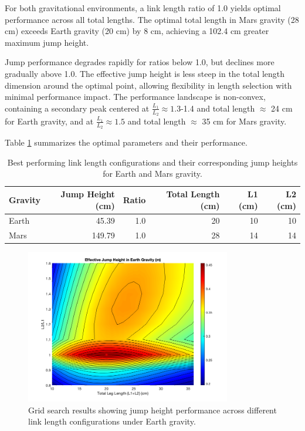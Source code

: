 For both gravitational environments, a link length ratio of 1.0 yields optimal performance across all total lengths. The optimal total length in Mars gravity (28 cm) exceeds Earth gravity (20 cm) by 8 cm, achieving a 102.4 cm greater maximum jump height.

Jump performance degrades rapidly for ratios below 1.0, but declines more gradually above 1.0. The effective jump height is less steep in the total length dimension around the optimal point, allowing flexibility in length selection with minimal performance impact. The performance landscape is non-convex, containing a secondary peak centered at \(\frac{L_1}{L_2} \approx 1.3\)-1.4 and total length $\approx$ 24 cm for Earth gravity, and at \(\frac{L_1}{L_2} \approx 1.5\) and total length $\approx$ 35 cm for Mars gravity.

Table \ref{tab:results:grid_search:best_jumps} summarizes the optimal parameters and their performance.
\begin{table}[h]

    \centering
    \begin{tabular}{lrrrrr}
        \hline
        Gravity & Jump Height (cm) & Ratio & Total Length (cm) & L1 (cm) & L2 (cm) \\
        \hline
        Earth & 45.39 & 1.0 & 20 & 10 & 10 \\
        Mars & 149.79 & 1.0 & 28 & 14 & 14 \\
        \hline
    \end{tabular}
    \caption{Best performing link length configurations and their corresponding jump heights for Earth and Mars gravity.}
    \label{tab:results:grid_search:best_jumps}
\end{table}


\begin{figure}[H]
    \centering
    \includegraphics[width=0.8\textwidth]{Images/results/grid_search_earth.png}
    \caption{Grid search results showing jump height performance across different link length configurations under Earth gravity.}
    \label{fig:results:grid_search_earth}
\end{figure}



